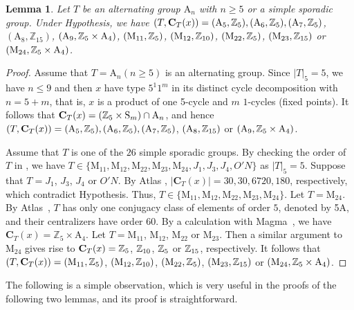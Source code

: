 \documentclass[12pt,reqno]{amsart}
\newcommand\A{\mathrm{A}} \newcommand\AGL{\mathrm{AGL}} \newcommand\AGammaL{\mathrm{A\Gamma L}} \newcommand\Alt{\mathrm{Alt}} \newcommand\ASL{\mathrm{ASL}} \newcommand\ASigmaL{\mathrm{A \Sigma L}} \newcommand\Aut{\mathrm{Aut}}
\def\C{\mathbf{C}}   \newcommand\Cay{\mathrm{Cay}}   \newcommand\Cos{\mathrm{Cos}} \newcommand{\CGammaSp}{\mathrm{C\Gamma Sp}}
\newcommand\M{\mathrm{M}} \newcommand{\magma}{{\sc Magma}} \renewcommand \mod{{\rm mod~}}
\newcommand\mz{\mathbb{Z}}
\numberwithin {equation} {section}
\newtheorem{lemma}[theorem]{Lemma}
\begin{document}
\begin{lemma}\label{lm:ansporadic}
 Let $T$ be an alternating group $\A_n$ with $n\geq 5$ or a  simple sporadic group. Under Hypothesis, we have $(T,\C_T(x))=(\A_5,\ZZ_5),(\A_6,\ZZ_5),(\A_7,\ZZ_5)$, $(\A_8,\mz_{15})$, $(\A_9,\ZZ_5\times\A_4)$, $(\M_{11},\ZZ_5)$, $(\M_{12},\ZZ_{10})$, $(\M_{22},\ZZ_5)$, $(\M_{23},\ZZ_{15})$ or $(\M_{24},\ZZ_5\times\A_4)$.
\end{lemma}
\begin{proof}
Assume that $T=\A_n (n\geq 5)$ is an alternating  group. Since $|T|_5=5$, we have $n\leq 9$ and then $x$ have type $5^1 1^m$ in its distinct cycle decomposition with $n=5+m$, that is, $x$ is a product of one 5-cycle and $m$ $1$-cycles (fixed points). It follows that $\C_{T}(x)=(\ZZ_5 \times \Sy_m) \cap \A_{n}$, and hence $(T,\C_T(x))=(\A_5,\ZZ_5),(\A_6,\ZZ_5),(\A_7,\ZZ_5)$, $(\A_8,\ZZ_{15})$ or $(\A_9,\ZZ_5\times\A_4)$.

Assume that $T $ is one of the $26$  simple sporadic groups. By checking the order of $T$ in \cite[Table 5.1.C]{K-Lie}, we have $T\in \{ \M_{11},\M_{12},\M_{22},\M_{23},\M_{24},J_{1},J_{3},J_{4},O'N\}$ as $|T|_5=5$.
Suppose that $T=J_{1}$, $J_{3}$, $J_{4}$ or $O'N$. By Atlas \cite{Atlas}, $|\C_T(x)|=30,30,6720,180$, respectively, which contradict Hypothesis. Thus, $T\in \{ \M_{11},\M_{12},\M_{22},\M_{23},\M_{24}\}$.
Let $T=\M_{24}$. By Atlas~\cite[pp.94]{Atlas}, $T$ has only one conjugacy class of elements of order $5$, denoted by 5A, and their centralizers have order $60$. By a calculation with {\sc Magma}~\cite{Magma}, we have $\C_T(x)=\mz_5\times\A_4$. Let $T=\M_{11}$, $\M_{12}$, $\M_{22}$ or $\M_{23}$. Then a similar argument to $\M_{24}$ gives rise to $\C_T(x)=\ZZ_5$, $\mathbb{Z}_{10}$, $\mathbb{Z}_5$ or $\mathbb{Z}_{15}$, respectively. It follows that $(T,\C_T(x))= (\M_{11},\ZZ_5)$, $(\M_{12},\ZZ_{10})$, $(\M_{22},\ZZ_5)$, $(\M_{23},\ZZ_{15})$ or $(\M_{24},\ZZ_5\times\A_4)$.
\end{proof}

The following is a simple observation, which is very useful in the proofs of the following two lemmas, and its proof is straightforward.
\end{document}

